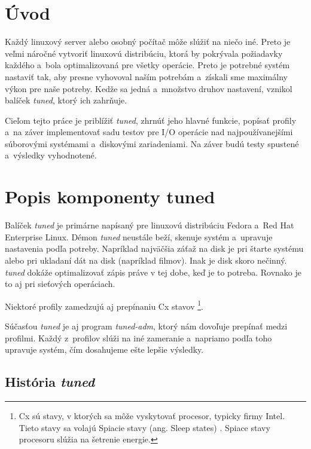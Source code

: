 %
%

\chapter{Úvod}

Každý linuxový server alebo osobný počítač môže slúžiť na niečo iné. Preto je
veľmi náročné vytvoriť linuxovú distribúciu, ktorá by pokrývala požiadavky
každého a~bola optimalizovaná pre všetky operácie. Preto je potrebné systém
nastaviť tak, aby presne vyhovoval naším potrebám a~získali sme maximálny výkon
pre naše potreby. Kedže sa jedná a~množstvo druhov nastavení, vznikol balíček
\emph{tuned}\cite{tunedHomepage}, ktorý ich zahrňuje.

Cieľom tejto práce je priblížiť \emph{tuned}, zhrnúť jeho hlavné funkcie,
popísať profily a~na záver implementovať sadu testov pre I/O operácie nad
najpoužívanejšími súborovými systémami a~diskovými zariadeniami. Na záver budú
testy spustené a~výsledky vyhodnotené.

%
%

\chapter{Popis komponenty tuned}

Balíček \emph{tuned} je primárne napísaný pre linuxovú distribúciu
Fedora\cite{fedoraHomepage} a~Red Hat Enterprise Linux. Démon \emph{tuned} neustále
beží, skenuje systém a~upravuje nastavenia podľa potreby. Napríklad najväčšia
záťaž na disk je pri štarte systému alebo pri ukladaní dát na disk (napríklad
filmov). Inak je disk skoro nečinný. \emph{tuned} dokáže optimalizovať zápis práve v
tej dobe, keď je to potreba. Rovnako je to aj pri sieťových operáciach.

Niektoré profily zamedzujú aj prepínaniu Cx stavov \footnote{Cx sú stavy, v
ktorých sa môže vyskytovať procesor, typicky firmy Intel. Tieto stavy sa volajú
Spiacie stavy (ang. Sleep states) \cite{sleepStates}. Spiace stavy procesoru
slúžia na šetrenie energie.}.

Súčasťou \emph{tuned} je aj program \emph{tuned-adm}, ktorý nám dovoľuje
prepínať medzi profilmi. Každý z~profilov slúži na iné zameranie a~napriamo
podľa toho upravuje systém, čím dosahujeme ešte lepšie výsledky.

%
%

\section{História \emph{tuned}}
\label{sec:historiaTuned}

